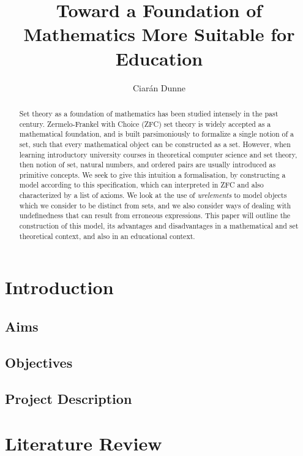 \documentclass[12pt]{report}
\title{Toward a Foundation of Mathematics More Suitable for Education}
\author{Ciarán Dunne}
\begin{document}
\begin{minipage}[h]{0.9\textwidth}
\maketitle
\begin{abstract}
Set theory as a foundation of mathematics has been studied intensely in the past century. Zermelo-Frankel with Choice (ZFC) set theory is widely accepted as a mathematical foundation, and is built parsimoniously to formalize a single notion of a set, such that every mathematical object can be constructed as a set. However, when learning introductory university courses in theoretical computer science and set theory, then notion of set, natural numbers, and ordered pairs are usually introduced as primitive concepts. We seek to give this intuition a formalisation, by constructing a model according to this specification, which can interpreted in ZFC and also characterized by a list of axioms. We look at the use of \emph{urelements} to model objects which we consider to be distinct from sets, and we also consider ways of dealing with undefinedness that can result from erroneous expressions. This paper will outline the construction of this model, its advantages and disadvantages in a mathematical and set theoretical context, and also in an educational context.
\end{abstract}
\end{minipage}
\clearpage

\chapter{Introduction}


\section{Aims}
\section{Objectives}
\section{Project Description}


\chapter{Literature Review}
\end{document}
